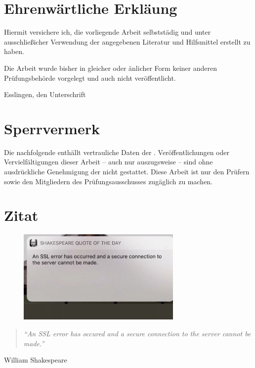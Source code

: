\chapter*{Ehrenwärtliche Erkläung}

Hiermit versichere ich, die vorliegende Arbeit selbststädig und unter ausschließicher Verwendung der angegebenen Literatur und Hilfsmittel erstellt zu haben.

Die Arbeit wurde bisher in gleicher oder änlicher Form keiner anderen Prüfungsbehörde vorgelegt und auch nicht veröffentlicht.

\hrulefill

Esslingen, den \workDate \hspace*{\fill} Unterschrift


\newpage
%
\chapter*{Sperrvermerk} %

Die nachfolgende \workType enthällt vertrauliche Daten der \workComany.
Veröffentlichungen oder Vervielfältigungen dieser Arbeit -- auch nur auszugsweise -- sind ohne ausdrückliche Genehmigung der \workComany nicht gestattet.
Diese Arbeit ist nur den Prüfern sowie den Mitgliedern des Prüfungsausschusses zugäglich zu machen.
\newpage
%
\chapter*{Zitat} %
\begin{center}
\begin{figure}[ht]
  \centering
  \includegraphics[width=8cm]{assets/shakespeare.jpeg}
\end{figure}

\begin{minipage}{12cm}
\begin{quotation}
\textit{\enquote{An SSL error has occured and a secure connection to the server cannot be made.}}
\end{quotation}
\hfill \textsf William Shakespeare
\end{minipage}
\end{center}
\newpage{}
%
